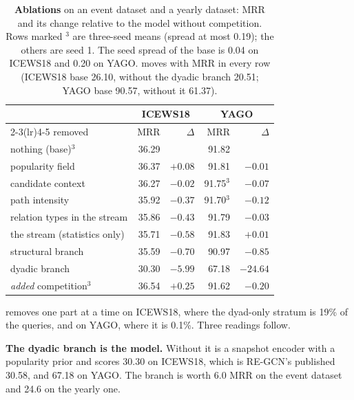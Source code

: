 \begin{table}[t]
  \centering\small
  \caption{\textbf{Ablations} on an event dataset and a yearly dataset: MRR and its change relative to the model without competition. Rows marked $^{3}$ are three-seed means (spread at most 0.19); the others are seed 1. The seed spread of the base is 0.04 on ICEWS18 and 0.20 on YAGO. \hone{} moves with MRR in every row (ICEWS18 base 26.10, without the dyadic branch 20.51; YAGO base 90.57, without it 61.37).}
  \label{tab:ablation}
  \setlength{\tabcolsep}{4pt}\footnotesize
  \begin{tabular}{l rr rr}
    \toprule
    & \multicolumn{2}{c}{ICEWS18} & \multicolumn{2}{c}{YAGO} \\
    \cmidrule(lr){2-3}\cmidrule(lr){4-5}
    removed & MRR & $\Delta$ & MRR & $\Delta$ \\
    \midrule
    nothing (base)$^{3}$           & 36.29 &         & 91.82 & \\
    popularity field               & 36.37 & $+0.08$ & 91.81 & $-0.01$ \\
    candidate context              & 36.27 & $-0.02$ & 91.75$^{3}$ & $-0.07$ \\
    path intensity                 & 35.92 & $-0.37$ & 91.70$^{3}$ & $-0.12$ \\
    relation types in the stream   & 35.86 & $-0.43$ & 91.79 & $-0.03$ \\
    the stream (statistics only)   & 35.71 & $-0.58$ & 91.83 & $+0.01$ \\
    structural branch              & 35.59 & $-0.70$ & 90.97 & $-0.85$ \\
    dyadic branch                  & 30.30 & $-5.99$ & 67.18 & $-24.64$ \\
    \midrule
    \emph{added} competition$^{3}$ & 36.54 & $+0.25$ & 91.62 & $-0.20$ \\
    \bottomrule
  \end{tabular}
\end{table}

 removes one part at a time on ICEWS18, where the dyad-only stratum is 19\% of the queries, and on YAGO, where it is 0.1\%. Three readings follow.

\textbf{The dyadic branch is the model.} Without it \model{} is a snapshot encoder with a popularity prior and scores 30.30 on ICEWS18, which is RE-GCN's published 30.58, and 67.18 on YAGO. The branch is worth 6.0 MRR on the event dataset and 24.6 on the yearly one.

